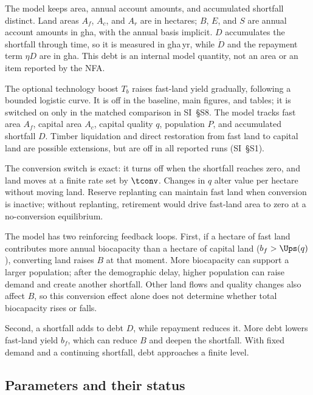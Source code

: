 The model keeps area, annual account amounts, and accumulated shortfall distinct. Land areas $A_f$, $A_c$, and $A_r$ are in hectares; $B$, $E$, and $S$ are annual account amounts in gha, with the annual basis implicit. $D$ accumulates the shortfall through time, so it is measured in gha\,yr, while $\dot D$ and the repayment term $\eta D$ are in gha. This debt is an internal model quantity, not an area or an item reported by the NFA.

The optional technology boost $T_b$ raises fast-land yield gradually, following a bounded logistic curve. It is off in the baseline, main figures, and tables; it is switched on only in the matched comparison in SI~\S S8. The model tracks fast area $A_f$, capital area $A_c$, capital quality $q$, population $P$, and accumulated shortfall $D$. Timber liquidation and direct restoration from fast land to capital land are possible extensions, but are off in all reported runs (SI~\S S1).

The conversion switch is exact: it turns off when the shortfall reaches zero, and land moves at a finite rate set by $\tconv$. Changes in $q$ alter value per hectare without moving land. Reserve replanting can maintain fast land when conversion is inactive; without replanting, retirement would drive fast-land area to zero at a no-conversion equilibrium.

The model has two reinforcing feedback loops. First, if a hectare of fast land contributes more annual biocapacity than a hectare of capital land ($b_f>\Ups(q)$), converting land raises $B$ at that moment. More biocapacity can support a larger population; after the demographic delay, higher population can raise demand and create another shortfall. Other land flows and quality changes also affect $B$, so this conversion effect alone does not determine whether total biocapacity rises or falls.

Second, a shortfall adds to debt $D$, while repayment reduces it. More debt lowers fast-land yield $b_f$, which can reduce $B$ and deepen the shortfall. With fixed demand and a continuing shortfall, debt approaches a finite level.

\subsection{Parameters and their status}\label{sec:params}

